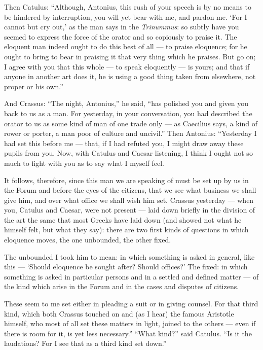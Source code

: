  Then Catulus: ``Although, Antonius, this rush of your speech is by no means to be hindered by interruption, you will yet bear with me, and pardon me. `For I cannot but cry out,' as the man says in the \textit{Trinummus}: so subtly have you seemed to express the force of the orator and so copiously to praise it. The eloquent man indeed ought to do this best of all — to praise eloquence; for he ought to bring to bear in praising it that very thing which he praises. But go on; I agree with you that this whole — to speak eloquently — is yours; and that if anyone in another art does it, he is using a good thing taken from elsewhere, not proper or his own.''

 And Crassus: ``The night, Antonius,'' he said, ``has polished you and given you back to us as a man. For yesterday, in your conversation, you had described the orator to us as some kind of man of one trade only — as Caecilius says, a kind of rower or porter, a man poor of culture and uncivil.'' Then Antonius: ``Yesterday I had set this before me — that, if I had refuted you, I might draw away these pupils from you. Now, with Catulus and Caesar listening, I think I ought not so much to fight with you as to say what I myself feel.

 It follows, therefore, since this man we are speaking of must be set up by us in the Forum and before the eyes of the citizens, that we see what business we shall give him, and over what office we shall wish him set. Crassus yesterday — when you, Catulus and Caesar, were not present — laid down briefly in the division of the art the same that most Greeks have laid down (and showed not what he himself felt, but what they say): there are two first kinds of questions in which eloquence moves, the one unbounded, the other fixed.

 The unbounded I took him to mean: in which something is asked in general, like this — `Should eloquence be sought after? Should offices?' The fixed: in which something is asked in particular persons and in a settled and defined matter — of the kind which arise in the Forum and in the cases and disputes of citizens.

 These seem to me set either in pleading a suit or in giving counsel. For that third kind, which both Crassus touched on and (as I hear) the famous Aristotle himself, who most of all set these matters in light, joined to the others — even if there is room for it, is yet less necessary.'' ``What kind?'' said Catulus. ``Is it the laudations? For I see that as a third kind set down.''

